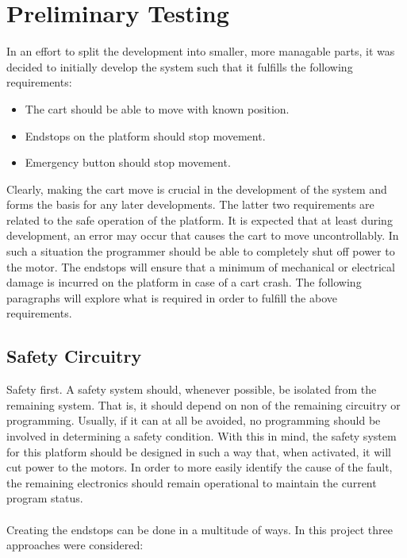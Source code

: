 \section{Preliminary Testing} %
\label{sec:preliminary_testing}
In an effort to split the development into smaller, more managable parts, it was decided to initially develop the system such that it fulfills the following requirements:

\begin{itemize}
	\item The cart should be able to move with known position.
	\item Endstops on the platform should stop movement.
	\item Emergency button should stop movement.
\end{itemize}

Clearly, making the cart move is crucial in the development of the system and forms the basis for any later developments.
The latter two requirements are related to the safe operation of the platform.
It is expected that at least during development, an error may occur that causes the cart to move uncontrollably.
In such a situation the programmer should be able to completely shut off power to the motor.
The endstops will ensure that a minimum of mechanical or electrical damage is incurred on the platform in case of a cart crash.
The following paragraphs will explore what is required in order to fulfill the above requirements.
\subsection{Safety Circuitry} %
\label{sub:safety_circuitry}
Safety first.
A safety system should, whenever possible, be isolated from the remaining system.
That is, it should depend on non of the remaining circuitry or programming.
Usually, if it can at all be avoided, no programming should be involved in determining a safety condition.
With this in mind, the safety system for this platform should be designed in such a way that, when activated, it will cut power to the motors.
In order to more easily identify the cause of the fault, the remaining electronics should remain operational to maintain the current program status.
\\~\\
Creating the endstops can be done in a multitude of ways.
In this project three approaches were considered:
